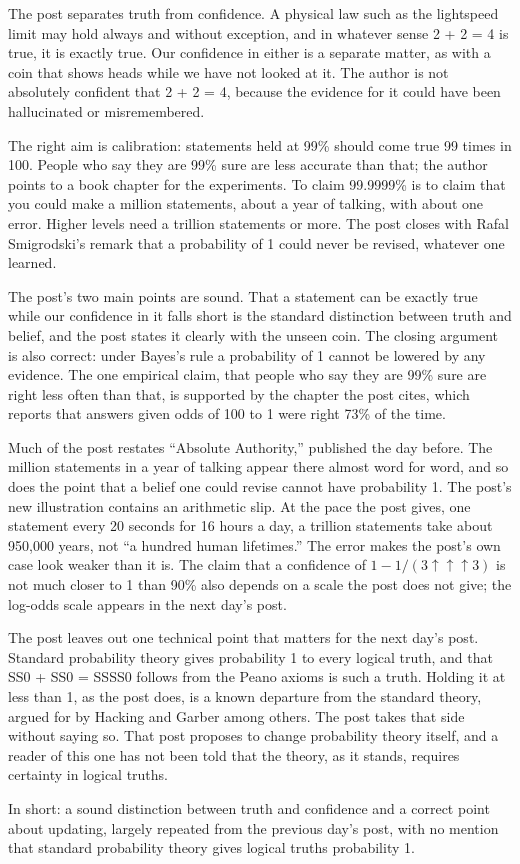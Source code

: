 \begin{afterword}
\summaryhead

The post separates truth from confidence. A physical law such as the lightspeed limit may hold always and without exception, and in whatever sense 2 + 2 = 4 is true, it is exactly true. Our confidence in either is a separate matter, as with a coin that shows heads while we have not looked at it. The author is not absolutely confident that 2 + 2 = 4, because the evidence for it could have been hallucinated or misremembered.

The right aim is calibration: statements held at 99\% should come true 99 times in 100. People who say they are 99\% sure are less accurate than that; the author points to a book chapter for the experiments. To claim 99.9999\% is to claim that you could make a million statements, about a year of talking, with about one error. Higher levels need a trillion statements or more. The post closes with Rafal Smigrodski's remark that a probability of 1 could never be revised, whatever one learned.

\responsehead

The post's two main points are sound. That a statement can be exactly true while our confidence in it falls short is the standard distinction between truth and belief, and the post states it clearly with the unseen coin. The closing argument is also correct: under Bayes's rule a probability of 1 cannot be lowered by any evidence. The one empirical claim, that people who say they are 99\% sure are right less often than that, is supported by the chapter the post cites, which reports that answers given odds of 100 to 1 were right 73\% of the time.

Much of the post restates ``Absolute Authority,'' published the day before. The million statements in a year of talking appear there almost word for word, and so does the point that a belief one could revise cannot have probability 1. The post's new illustration contains an arithmetic slip. At the pace the post gives, one statement every 20 seconds for 16 hours a day, a trillion statements take about 950,000 years, not ``a hundred human lifetimes.'' The error makes the post's own case look weaker than it is. The claim that a confidence of $1 - 1/(3 \uparrow\uparrow\uparrow 3)$ is not much closer to 1 than 90\% also depends on a scale the post does not give; the log-odds scale appears in the next day's post.

The post leaves out one technical point that matters for the next day's post. Standard probability theory gives probability 1 to every logical truth, and that SS0 + SS0 = SSSS0 follows from the Peano axioms is such a truth. Holding it at less than 1, as the post does, is a known departure from the standard theory, argued for by Hacking and Garber among others. The post takes that side without saying so. That post proposes to change probability theory itself, and a reader of this one has not been told that the theory, as it stands, requires certainty in logical truths.

In short: a sound distinction between truth and confidence and a correct point about updating, largely repeated from the previous day's post, with no mention that standard probability theory gives logical truths probability 1.
\end{afterword}
